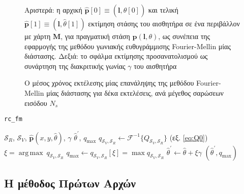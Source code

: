 \begin{figure}[!h]\centering
  \vspace{0.5cm}
  
  \vspace{0.5cm}
  \caption{\small Αριστερά: η αρχική
           $\hat{\bm{p}}[0] \equiv (\bm{l},\hat{\theta}[0])$ και τελική
           $\hat{\bm{p}}[1] \equiv (\bm{l},\hat{\theta}[1])$ εκτίμηση στάσης του
           αισθητήρα σε ένα περιβάλλον με χάρτη $\bm{M}$, για πραγματική στάση
           $\bm{p}(\bm{l},\theta)$, ως συνέπεια της εφαρμογής της μεθόδου
           γωνιακής ευθυγράμμισης Fourier-Mellin μίας διάστασης. Δεξιά: το
           σφάλμα εκτίμησης προσανατολισμού ως συνάρτηση της διακριτικής γωνίας
           $\gamma$ του αισθητήρα}
  \label{fig:02_04_02:rc_fm}
\end{figure}

\begin{figure}[!h]\centering
  
  \caption{\small Ο μέσος χρόνος εκτέλεσης μίας επανάληψης της μεθόδου
           Fourier-Mellin μίας διάστασης για δέκα εκτελέσεις, ανά μέγεθος
           σαρώσεων εισόδου $N_s$}
  \label{fig:02_04_02:rc_fm_exec_time}
\end{figure}

\begin{algorithm}[!h]
  \caption{\texttt{rc\_fm}}
  \begin{spacing}{1.3}
  \begin{algorithmic}[1]
    \REQUIRE $\mathcal{S}_R$, $\mathcal{S}_V$, $\hat{\bm{p}}(x, y, \hat{\theta})$, $\gamma$
    \ENSURE $\hat{\theta}^\prime$, $q_{\max}$
    \STATE $q_{\mathcal{S}_V, \mathcal{S}_R} \leftarrow \mathcal{F}^{-1}\{Q_{\mathcal{S}_V, \mathcal{S}_R}\}$ (εξ. \ref{eq:Q0})
    \STATE $\xi = \operatorname*{arg\,max} \ q_{\mathcal{S}_V, \mathcal{S}_R}$
    \STATE $q_{\max} \leftarrow q_{\mathcal{S}_V, \mathcal{S}_R}[\xi] = \max q_{\mathcal{S}_V, \mathcal{S}_R}$
    \STATE $\hat{\theta}^\prime \leftarrow \hat{\theta} + \xi \gamma$
    \RETURN $(\hat{\theta}^\prime, q_{\max})$
  \end{algorithmic}
  \end{spacing}
  \label{alg:algorithm_fmrc}
\end{algorithm}


\subsection{Η μέθοδος Πρώτων Αρχών}
\label{subsection:02_04_02:02}

